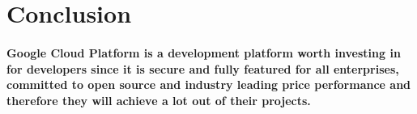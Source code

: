 \documentclass{article}
\begin{document}
\section{Conclusion}
\paragraph{
Google Cloud Platform is a development platform worth investing in for developers since it is secure and fully featured for all enterprises, committed to open source and industry leading price performance and therefore they will achieve a lot out of their projects.}

\newpage


\end{document}
